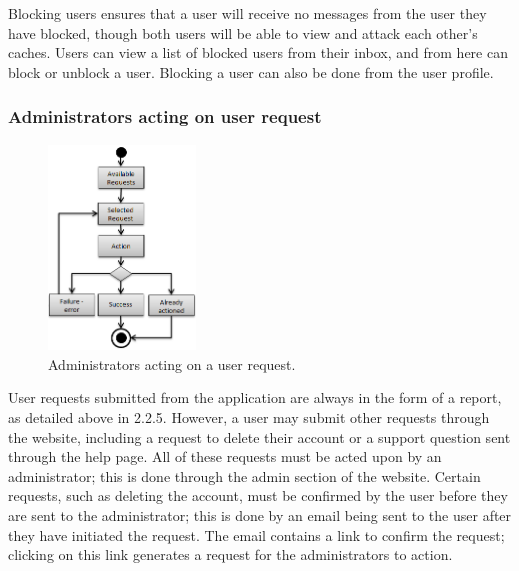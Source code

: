 Blocking users ensures that a user will receive no messages from the user they have blocked, though both users will be able to view and attack each other’s caches. Users can view a list of blocked users from their inbox, and from here can block or unblock a user. Blocking a user can  also be done from the user profile.

\subsubsection{Administrators acting on user request}

\begin{figure}
	\vspace{-20pt}
	\begin{center}
	\includegraphics[width=0.35\textwidth]{images/admins_acting}
	\caption{Administrators acting on a user request.}
	\label{admins_acting}
	\end{center}
	\vspace{-40pt}
\end{figure}

User requests submitted from the application are always in the form of a report, as detailed above in 2.2.5. However, a user may submit other requests through the website, including a request to delete their account or a support question sent through the help page. All of these requests must be acted upon by an administrator; this is done through the admin section of the website. Certain requests, such as deleting the account, must be confirmed by the user before they are sent to the administrator; this is done by an email being sent to the user after they have initiated the request. The email contains a link to confirm the request; clicking on this link generates a request for the administrators to action.

